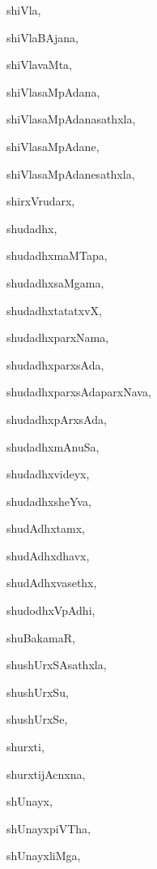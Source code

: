 \begin{multicols}{2}
{shiVla}, \pageref{shiVla}

{shiVlaBAjana}, \pageref{shiVlaBAjana}

{shiVlavaMta}, \pageref{shiVlavaMta}

{shiVlasaMpAdana}, \pageref{shiVlasaMpAdana}

{shiVlasaMpAdanasathxla}, \pageref{shiVlasaMpAdanasathxla}

{shiVlasaMpAdane}, \pageref{shiVlasaMpAdane}

{shiVlasaMpAdanesathxla}, \pageref{shiVlasaMpAdanesathxla}

{shirxVrudarx}, \pageref{shirxVrudarx}

{shudadhx}, \pageref{shudadhx}

{shudadhxmaMTapa}, \pageref{shudadhxmaMTapa}

{shudadhxsaMgama}, \pageref{shudadhxsaMgama}

{shudadhxtatatxvX}, \pageref{shudadhxtatatxvX}

{shudadhxparxNama}, \pageref{shudadhxparxNama}

{shudadhxparxsAda}, \pageref{shudadhxparxsAda}

{shudadhxparxsAdaparxNava}, \pageref{shudadhxparxsAdaparxNava}

{shudadhxpArxsAda}, \pageref{shudadhxpArxsAda}

{shudadhxmAnuSa}, \pageref{shudadhxmAnuSa}

{shudadhxvideyx}, \pageref{shudadhxvideyx}

{shudadhxsheYva}, \pageref{shudadhxsheYva}

{shudAdhxtamx}, \pageref{shudAdhxtamx}

{shudAdhxdhavx}, \pageref{shudAdhxdhavx}

{shudAdhxvasethx}, \pageref{shudAdhxvasethx}

{shudodhxVpAdhi}, \pageref{shudodhxVpAdhi}

{shuBakamaR}, \pageref{shuBakamaR}

{shushUrxSAsathxla}, \pageref{shushUrxSAsathxla}

{shushUrxSu}, \pageref{shushUrxSu}

{shushUrxSe}, \pageref{shushUrxSe}

{shurxti}, \pageref{shurxti}

{shurxtijAcnxna}, \pageref{shurxtijAcnxna}

{shUnayx}, \pageref{shUnayx}

{shUnayxpiVTha}, \pageref{shUnayxpiVTha}

{shUnayxliMga}, \pageref{shUnayxliMga}


\end{multicols}

